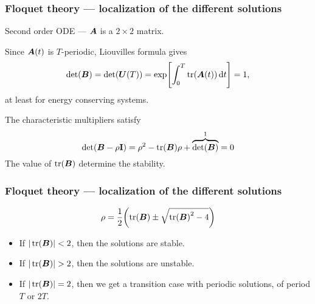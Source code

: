 \documentclass[swedish, english]{beamer}
\begin{document}
\begin{frame}


\end{frame}







\begin{frame}
\frametitle{Floquet theory --- localization of the different solutions}
Second order ODE --- $\vb*{A}$ is a $2\times2$ matrix.
\vspace{11pt}

Since $\vb*{A}(t)$ is $T$-periodic, Liouvilles formula gives
\[ \det(\vb*{B})=\det(\vb*{U}(T))=\exp[\int_0^{T}\tr(\vb*{A}(t))\dd{t}]
=1, \]
at least for energy conserving systems.

\vspace{11pt}
The characteristic multipliers satisfy
\vspace{-15pt}\[
\det(\vb*{B}-\rho\vb{I})=\rho^2-\tr(\vb*{B})\rho+\overbrace{\det(\vb*{B})}^{1}=0
\]
The value of $\tr(\vb*{B})$ determine the stability.
\end{frame}


\begin{frame}
\frametitle{Floquet theory --- localization of the different
  solutions}
\[ \rho = \frac{1}{2}\qty(\tr(\vb*{B})\pm\sqrt{\tr(\vb*{B})^2-4}) \]
\vspace{11pt}
\begin{itemize}
\item If $|\tr(\vb*{B})|<2$, then the solutions are stable.
\vspace{11pt}
\item If $|\tr(\vb*{B})|>2$, then the solutions are unstable.
\vspace{11pt}
\item If $|\tr(\vb*{B})|=2$, then we get a transition case with
periodic solutions, of period $T$ or $2T$.  
\end{itemize}
\end{frame}
\end{document}
